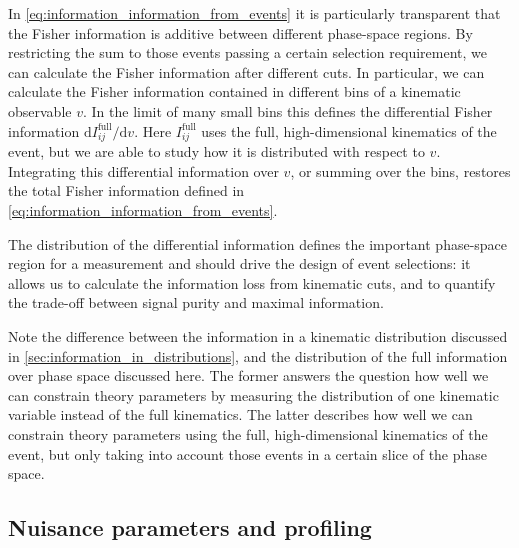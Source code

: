 In \autoref{eq:information_information_from_events} it is particularly
transparent that the Fisher information is additive between different
phase-space regions.  By restricting the sum to those events passing a
certain selection requirement, we can calculate the Fisher information
after different cuts. In particular, we can calculate the Fisher
information contained in different bins of a kinematic observable
$v$. In the limit of many small bins this defines the differential
Fisher information $\mathrm{d} I_{ij}^{\text{full}} / \mathrm{d} v$.
Here $I_{ij}^{\text{full}}$ uses the full, high-dimensional kinematics
of the event, but we are able to study how it is distributed with
respect to $v$. Integrating this differential information over $v$, or
summing over the bins, restores the total Fisher information defined
in \autoref{eq:information_information_from_events}.

The distribution of the differential information defines the important
phase-space region for a measurement and should drive the design of
event selections: it allows us to calculate the information loss from
kinematic cuts, and to quantify the trade-off between signal purity
and maximal information.

Note the difference between the information in a kinematic
distribution discussed in \autoref{sec:information_in_distributions},
and the distribution of the full information over phase space
discussed here. The former answers the question how well we can
constrain theory parameters by measuring the distribution of one
kinematic variable instead of the full kinematics. The latter
describes how well we can constrain theory parameters using the full,
high-dimensional kinematics of the event, but only taking into account
those events in a certain slice of the phase space.



\subsection{Nuisance parameters and profiling}

